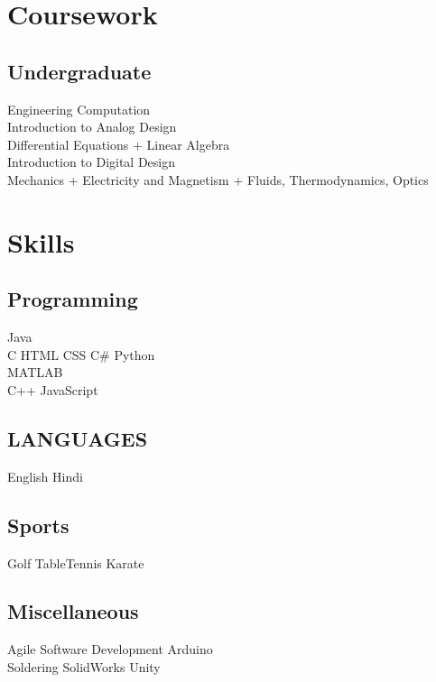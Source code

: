 \documentclass[]{deedy-resume-openfont}
\begin{document}
\begin{minipage}[t]{0.31\textwidth}
\sectionsep

\section{Coursework}

\subsection{Undergraduate}
\textbullet Engineering Computation \\
\textbullet Introduction to Analog Design \\
\textbullet Differential Equations + Linear Algebra \\
\textbullet Introduction to Digital Design \\
\textbullet Mechanics + Electricity and Magnetism + Fluids, Thermodynamics, Optics \\
\sectionsep


\section{Skills}
\subsection{Programming}
Java  \\
C \textbullet{} HTML \textbullet{} CSS \textbullet{} C\# \textbullet{} Python \\
MATLAB \\
C++ \textbullet{} JavaScript
\sectionsep
\subsection{LANGUAGES}
English \textbullet{} Hindi
\sectionsep

\subsection{Sports}
 Golf \textbullet{} Table\-Tennis \textbullet{} Karate\\
\sectionsep

\subsection{Miscellaneous}
Agile Software Development \textbullet{} Arduino \\
Soldering \textbullet{} SolidWorks \textbullet{} Unity

%
%

\end{minipage} 
\end{document}
